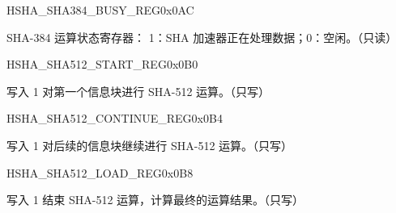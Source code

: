 \begin{register}{H}{SHA\_SHA384\_BUSY\_REG}{0x0AC}\label{regdesc:SHASHA384BUSYREG}
%
%
\regnewline%
\begin{regdesc}\begin{reglist}
\item [SHA\_SHA384\_BUSY] SHA-384 运算状态寄存器： 1：SHA 加速器正在处理数据；0：空闲。（只读）
\end{reglist}\end{regdesc}
\end{register}


\begin{register}{H}{SHA\_SHA512\_START\_REG}{0x0B0}\label{regdesc:SHASHA512STARTREG}
%
%
\regnewline%
\begin{regdesc}\begin{reglist}
\item [SHA\_SHA512\_START] 写入 1 对第一个信息块进行 SHA-512 运算。（只写）
\end{reglist}\end{regdesc}
\end{register}


\begin{register}{H}{SHA\_SHA512\_CONTINUE\_REG}{0x0B4}\label{regdesc:SHASHA512CONTINUEREG}
%
%
\regnewline%
\begin{regdesc}\begin{reglist}
\item [SHA\_SHA512\_CONTINUE] 写入 1 对后续的信息块继续进行 SHA-512 运算。（只写）
\end{reglist}\end{regdesc}
\end{register}


\begin{register}{H}{SHA\_SHA512\_LOAD\_REG}{0x0B8}\label{regdesc:SHASHA512LOADREG}
%
%
\regnewline%
\begin{regdesc}\begin{reglist}
\item [SHA\_SHA512\_LOAD] 写入 1 结束 SHA-512 运算，计算最终的运算结果。（只写）
\end{reglist}\end{regdesc}
\end{register}


